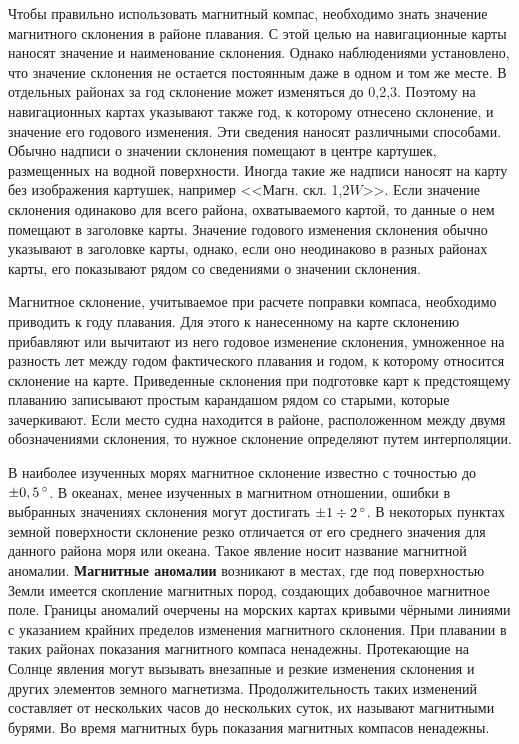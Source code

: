 Чтобы правильно использовать магнитный компас, необходимо знать значение магнитного склонения в районе плавания. С этой целью на навигационные карты наносят значение и наименование склонения. Однако наблюдениями установлено, что значение склонения не остается постоянным даже в одном и том же месте. В отдельных районах за год склонение может изменяться до 0,2,3\gr. Поэтому на навигационных картах указывают также год, к которому отнесено склонение, и значение его годового изменения. Эти сведения наносят различными способами. Обычно надписи о значении склонения помещают в центре картушек, размещенных на водной поверхности. Иногда такие же надписи наносят на карту без изображения картушек, например <<Магн. скл. 1,2\gr $W$>>. Если значение склонения одинаково для всего района, охватываемого картой, то данные о нем помещают в заголовке карты. Значение годового изменения склонения обычно указывают в заголовке карты, однако, если оно неодинаково в разных районах карты, его показывают рядом со сведениями о значении склонения.  

Магнитное склонение, учитываемое при расчете поправки компаса, необходимо приводить к году плавания. Для этого к нанесенному на карте склонению прибавляют или вычитают из него годовое изменение склонения, умноженное на разность лет между годом фактического плавания и годом, к которому относится склонение на карте. Приведенные склонения при подготовке карт к предстоящему плаванию записывают простым карандашом рядом со старыми, которые зачеркивают. Если место судна находится в районе, расположенном между двумя обозначениями склонения, то нужное склонение определяют путем интерполяции. 

В наиболее изученных морях магнитное склонение известно с точностью до $\pm 0,5\,^\circ$. В океанах, менее изученных в магнитном отношении, ошибки в выбранных значениях склонения могут достигать $\pm 1\div 2\,^\circ$. В некоторых пунктах земной поверхности склонение резко отличается от его среднего значения для данного района моря или океана. Такое явление носит название магнитной аномалии. \textbf{Магнитные аномалии} возникают в местах, где под поверхностью Земли имеется скопление магнитных пород, создающих добавочное магнитное поле. Границы аномалий очерчены на морских картах кривыми чёрными линиями с указанием крайних пределов изменения магнитного склонения. При плавании в таких районах показания магнитного компаса ненадежны. Протекающие на Солнце явления могут вызывать внезапные и резкие изменения склонения и других элементов земного магнетизма. Продолжительность таких изменений составляет от нескольких часов до нескольких суток, их называют магнитными бурями. Во время магнитных бурь показания магнитных компасов ненадежны. 

